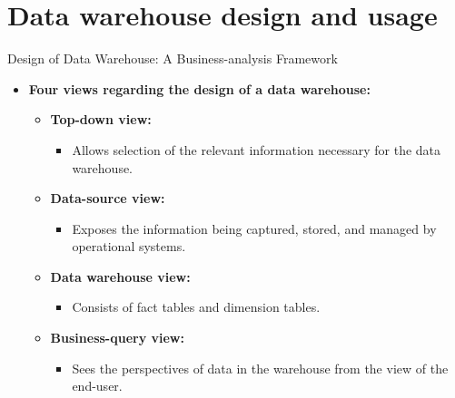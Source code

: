 \section{Data warehouse design and usage}

\begin{frame}{Design of Data Warehouse: A Business-analysis Framework}
  \begin{itemize}
  \item \textbf{Four views regarding the design of a data warehouse:}
    \begin{itemize}
    \item \textbf{\color{airforceblue}Top-down view:}
      \begin{itemize}
      \item Allows selection of the relevant information necessary for the data warehouse.
      \end{itemize}
    \item \textbf{\color{airforceblue}Data-source view:}
      \begin{itemize}
      \item Exposes the information being captured, stored, and managed by operational systems.
      \end{itemize}
    \item \textbf{\color{airforceblue}Data warehouse view:}
      \begin{itemize}
      \item Consists of fact tables and dimension tables.
      \end{itemize}
    \item \textbf{\color{airforceblue}Business-query view:}
      \begin{itemize}
      \item Sees the perspectives of data in the warehouse from the view of the end-user.
      \end{itemize}
    \end{itemize}
  \end{itemize}
\end{frame}

